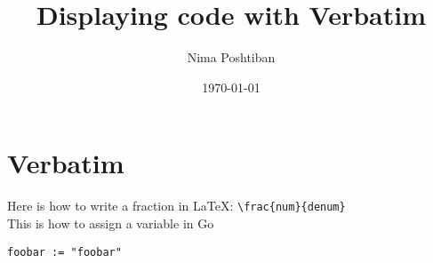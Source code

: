\documentclass[10pt]{article}
\author{Nima Poshtiban}
\date{\today}
\title{Displaying code with Verbatim}
\begin{document}
\maketitle


\section{Verbatim}
Here is how to write a fraction in \LaTeX: \verb"\frac{num}{denum}" %
\\This is how to assign a variable in Go%
\begin{verbatim}
foobar := "foobar"
\end{verbatim}

\end{document}
